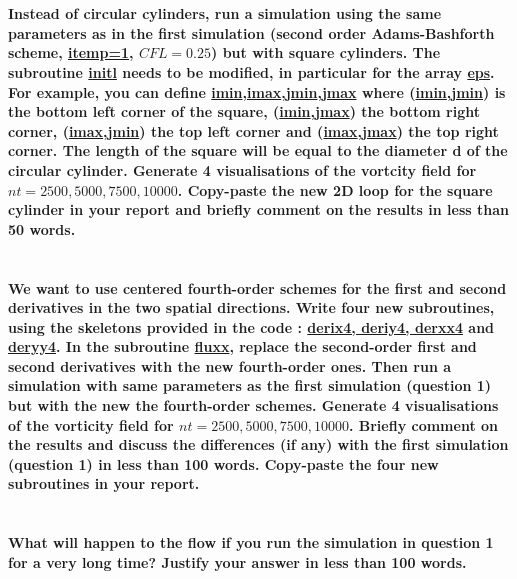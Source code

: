 \documentclass[10pt, a4paper]{article}
\begin{document}
\section{}
\textbf{Instead of circular cylinders, run a simulation using the same parameters as in the first simulation (second order Adams-Bashforth scheme, \url{itemp=1}, $CFL=0.25$) but with square cylinders. The subroutine \url{initl} needs to be modified, in particular for the array \url{eps}. For example, you can define \url{imin},\url{imax},\url{jmin},\url{jmax} where (\url{imin},\url{jmin}) is the bottom left corner of the square, (\url{imin},\url{jmax}) the bottom right corner, (\url{imax},\url{jmin}) the top left corner and (\url{imax},\url{jmax}) the top right corner. The length of the square will be equal to the diameter d of the circular cylinder. Generate 4 visualisations of the vortcity field for $nt = 2500, 5000, 7500, 10000$. Copy-paste the new 2D loop for the square cylinder in your report and briefly comment on the results in less than 50 words.}

\section{}
\textbf{We want to use centered fourth-order schemes for the first and second derivatives in the two spatial directions. Write four new subroutines, using the skeletons provided in the code : \url{derix4, deriy4, derxx4} and \url{deryy4}. In the subroutine \url{fluxx}, replace the second-order first and second derivatives with the new fourth-order ones. Then run a simulation with same parameters as the first simulation (question 1) but with the new the fourth-order schemes. Generate 4 visualisations of the vorticity field for $nt = 2500, 5000, 7500, 10000$. Briefly comment on the results and discuss the differences (if any) with the first simulation (question 1) in less than 100 words. Copy-paste the four new subroutines in your report.}

\section{}
\textbf{What will happen to the flow if you run the simulation in question 1 for a very long time? Justify your answer in less than 100 words.}
\end{document}
